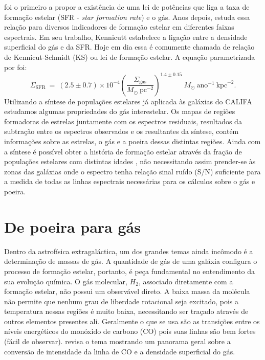 \citet{Schmidt.1959a} foi o primeiro a propor a existência de uma lei de potências que liga a taxa
de formação estelar (SFR - {\em star formation rate}) e o gás. Anos depois, \citet{Kennicutt.1998a}
estuda essa relação para diversos indicadores de formação estelar em diferentes faixas espectrais.
Em seu trabalho, Kennicutt estabelece a ligação entre a densidade superficial do gás e da SFR. Hoje
em dia essa é comumente chamada de relação de Kennicut-Schmidt (KS) ou lei de formação estelar. A
equação parametrizada por \citeauthor{Kennicutt.1998a} foi:
\begin{equation}
	\Sigma_{\mathrm{SFR}}\ =\ (2.5\pm0.7)\times 10^{-4} \left(\frac{\Sigma_{\mathrm{gas}}}{
M_\odot\ \mathrm{pc}^{-2}}\right)^{1.4 \pm 0.15}\ M_\odot\ \mathrm{ano}^{-1}\ \mathrm{kpc}^{-2}.
	\label{eq:SFRKennicutt}
\end{equation}
\noindent Utilizando a síntese de populações estelares já aplicada às galáxias do CALIFA estudamos
algumas propriedades do gás interestelar. Os mapas de regiões formadoras de estrelas juntamente com
os espectros residuais, resultados da subtração entre os espectros observados e os resultantes da
síntese, contém informações sobre as estrelas, o gás e a poeira dessas distintas regiões. Ainda com
a síntese é possível obter a história de formação estelar através da fração de populações estelares
com distintas idades \citep{Asari.etal.2007a}, não necessitando assim prender-se às zonas das
galáxias onde o espectro tenha relação sinal ruído (S/N) suficiente para a medida de todas as linhas
espectrais necessárias para os cálculos sobre o gás e poeira.

\section{De poeira para gás}
\label{sec:intro:dust2gas}

Dentro da astrofísica extragaláctica, um dos grandes temas ainda incômodo é a determinação de massas
de gás. A quantidade de gás de uma galáxia configura o processo de formação estelar, portanto, é
peça fundamental no entendimento da sua evolução química. O gás molecular, $H_2$, associado
diretamente com a formação estelar, não possui um observável direto. A baixa massa da molécula não
permite que nenhum grau de liberdade rotacional seja excitado, pois a temperatura nessas regiões é
muito baixa, necessitando ser traçado através de outros elementos presentes ali.
Geralmente o que se usa são as transições entre os níveis energéticos do monóxido de carbono (CO)
pois suas linhas são bem fortes (fácil de observar). \citep{Bolatto.etal.2013a} revisa o tema
mostrando um panorama geral sobre a conversão de intensidade da linha de CO e a densidade
superficial do gás.

